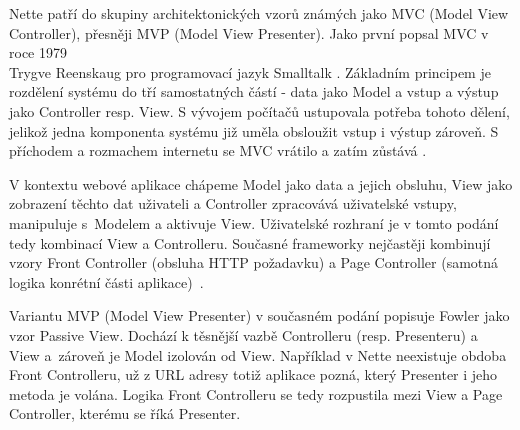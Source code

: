 Nette patří do skupiny architektonických vzorů známých jako MVC (Model View Controller), přesněji MVP (Model View Presenter). Jako první popsal MVC v roce 1979\\ Trygve Reenskaug pro programovací jazyk Smalltalk \cite{FowlerMVC}. Základním principem je rozdělení systému do tří samostatných částí - data jako Model a vstup a výstup jako Controller resp. View. S vývojem počítačů ustupovala potřeba tohoto dělení, jelikož jedna komponenta systému již uměla obsloužit vstup i výstup zároveň. S příchodem a rozmachem internetu se MVC vrátilo a zatím zůstává \cite{zdrojakMVC}.

V kontextu webové aplikace chápeme Model jako data a jejich obsluhu, View jako zobrazení těchto dat uživateli a Controller zpracovává uživatelské vstupy, manipuluje s~Modelem a aktivuje View. Uživatelské rozhraní je v tomto podání tedy kombinací View a Controlleru. Současné frameworky nejčastěji kombinují vzory Front Controller (obsluha HTTP požadavku) a Page Controller (samotná logika konrétní části aplikace)~\cite{FowlerMVC}.

Variantu MVP (Model View Presenter) v současném podání popisuje Fowler 
jako vzor Passive View. Dochází k těsnější vazbě Controlleru (resp. Presenteru) a View a~zároveň je Model izolován od View. Například v Nette neexistuje obdoba Front Controlleru, už z URL adresy totiž aplikace pozná, který Presenter i jeho metoda je volána. Logika Front Controlleru se tedy rozpustila mezi View a Page Controller, kterému se říká Presenter.
